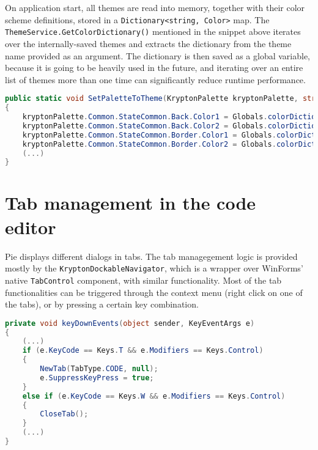 On application start, all themes are read into memory, together with their color scheme definitions, stored in a \texttt{Dictionary<string, Color>} map. The \texttt{ThemeService.GetColorDictionary()} mentioned in the snippet above iterates over the internally-saved themes and extracts the dictionary from the theme name provided as an argument. The dictionary is then saved as a global variable, because it is going to be heavily used in the future, and iterating over an entire list of themes more than one time can significantly reduce runtime performance.

\begin{lstlisting}[language=csharp, caption={ThemeService.SetPaletteToTheme() maps a color dictionary to corresponding control components from a KryptonPalette control}]
public static void SetPaletteToTheme(KryptonPalette kryptonPalette, string theme)
{
    kryptonPalette.Common.StateCommon.Back.Color1 = Globals.colorDictionary["Secondary"];
    kryptonPalette.Common.StateCommon.Back.Color2 = Globals.colorDictionary["Secondary"];
    kryptonPalette.Common.StateCommon.Border.Color1 = Globals.colorDictionary["Secondary"];
    kryptonPalette.Common.StateCommon.Border.Color2 = Globals.colorDictionary["Secondary"];
    (...)
}
\end{lstlisting}

\section{Tab management in the code editor}

Pie displays different dialogs in tabs. The tab managegement logic is provided mostly by the \texttt{KryptonDockableNavigator}, which is a wrapper over WinForms' native \texttt{TabControl} component, with similar functionality. Most of the tab functionalities can be triggered through the context menu (right click on one of the tabs), or by pressing a certain key combination.

\begin{lstlisting}[language=csharp, caption={An event listener that catches tab-related key bindings in Pie}]
private void keyDownEvents(object sender, KeyEventArgs e)
{
    (...)
    if (e.KeyCode == Keys.T && e.Modifiers == Keys.Control)
    {
        NewTab(TabType.CODE, null);
        e.SuppressKeyPress = true;
    }
    else if (e.KeyCode == Keys.W && e.Modifiers == Keys.Control)
    {
        CloseTab();
    }
    (...)
}
\end{lstlisting}

